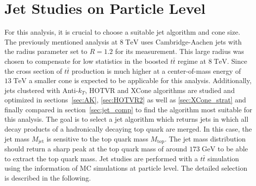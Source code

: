 \section{Jet Studies on Particle Level}
\label{sec:jet_studies}
	For this analysis, it is crucial to choose a suitable jet algorithm and cone size. The previously mentioned analysis at $8\;\text{TeV}$ \cite{torben_paper} uses Cambridge-Aachen jets with the radius parameter set to $R=1.2$ for its measurement. This large radius was chosen to compensate for low statistics in the boosted $t\bar{t}$ regime at $8\;\text{TeV}$. Since the cross section of $t\bar{t}$ production is much higher at a center-of-mass energy of $13\;\text{TeV}$ a smaller cone is expected to be applicable for this analysis. Additionally, jets clustered with Anti-$k_T$, HOTVR and XCone algorithms are studied and optimized in sections~\ref{sec:AK}, \ref{sec:HOTVR2} as well as \ref{sec:XCone_strat} and finally compared in section~\ref{sec:jet_comp} to find the algorithm most suitable for this analysis. The goal is to select a jet algorithm which returns jets in which all decay products of a hadronically decaying top quark are merged. In this case, the jet mass $M_\text{jet}$ is sensitive to the top quark mass $M_\text{top}$. The jet mass distribution should return a sharp peak at the top quark mass of around $173\;\text{GeV}$ to be able to extract the top quark mass. Jet studies are performed with a $t\bar{t}$ simulation using the information of MC simulations at particle level. The detailed selection is described in the following.

